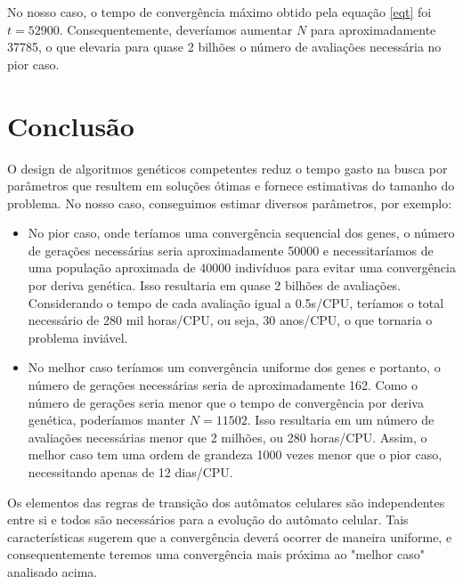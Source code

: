 \documentclass[]{scrreprt}
\begin{document}
No nosso caso, o tempo de convergência máximo obtido pela equação \ref{eqt} foi $t=52900$. Consequentemente, deveríamos aumentar $N$ para aproximadamente 37785, o que elevaria para quase 2 bilhões o número de avaliações necessária no pior caso.

\chapter{Conclusão}

O design de algoritmos genéticos competentes reduz o tempo gasto na busca por parâmetros que resultem em soluções ótimas e fornece estimativas do tamanho do problema. No nosso caso, conseguimos estimar diversos parâmetros, por exemplo:

\begin{itemize}
\item No pior caso, onde teríamos uma convergência sequencial dos genes, o número de gerações necessárias seria aproximadamente 50000 e necessitaríamos de uma população aproximada de 40000 indivíduos para evitar uma convergência por deriva genética. Isso resultaria em quase 2 bilhões de avaliações. Considerando o tempo de cada avaliação igual a 0.5s/CPU, teríamos o total necessário de 280 mil horas/CPU, ou seja, 30 anos/CPU, o que tornaria o problema inviável.

\item No melhor caso teríamos um convergência uniforme dos genes e portanto, o número de gerações necessárias seria de aproximadamente 162. Como o número de gerações seria menor que o tempo de convergência por deriva genética, poderíamos manter $N=11502$. Isso resultaria em um número de avaliações necessárias menor que 2 milhões, ou 280 horas/CPU. Assim, o melhor caso tem uma ordem de grandeza 1000 vezes menor que o pior caso, necessitando apenas de 12 dias/CPU.
\end{itemize}

Os elementos das regras de transição dos autômatos celulares são independentes entre si e todos são necessários para a evolução do autômato celular. Tais características sugerem que a convergência deverá ocorrer de maneira uniforme, e consequentemente teremos uma convergência mais próxima ao "melhor caso" analisado acima. 



\end{document}
